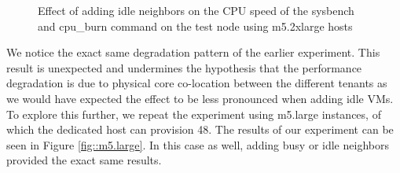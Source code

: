 \begin{figure}[H]
\centering
{}
\caption{Effect of adding idle neighbors on the CPU speed of the sysbench and cpu\_burn command on the test node using m5.2xlarge hosts} 
\label{fig::m5.2xlarge_idle}
\end{figure}
\noindent
We notice the exact same degradation pattern of the earlier experiment. This result is unexpected
and undermines the hypothesis that the performance degradation is due to physical core co-location between the different 
tenants as we would have expected the effect to be less pronounced when adding idle VMs. \\
To explore this further, we repeat the experiment using m5.large instances, of which the dedicated host can 
provision 48. The results of our experiment can be seen in Figure \ref{fig::m5.large}. In this 
case as well, adding busy or idle neighbors provided the exact same results.  

